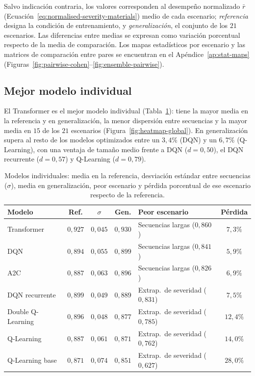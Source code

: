 \documentclass[../00_Main/Main.tex]{subfiles}
\begin{document}
\label{sec:results}

Salvo indicaci\'on contraria, los valores corresponden al
desempe\~no normalizado $\bar r$
(Ecuaci\'on~\eqref{eq:normalised-severity-materials}) medio de cada
escenario; \emph{referencia} designa la condici\'on de entrenamiento, y
\emph{generalizaci\'on}, el conjunto de los $21$ escenarios. Las diferencias
entre medias se expresan como variaci\'on porcentual respecto de la media
de comparaci\'on. Los mapas
estad\'isticos por escenario y las matrices de comparaci\'on entre pares
se encuentran en el Ap\'endice~\ref{ap:stat-maps}
(Figuras~\ref{fig:pairwise-cohen}--\ref{fig:ensemble-pairwise}).

\subsection{Mejor modelo individual}\label{sec:res-individual}

El Transformer es el mejor modelo individual
(Tabla~\ref{tab:global-mean}): tiene la mayor media en la referencia y
en generalizaci\'on, la menor dispersi\'on entre secuencias y la mayor
media en $15$ de los $21$ escenarios (Figura~\ref{fig:heatmap-global}).
En generalizaci\'on supera al resto de los modelos optimizados entre un
$3{,}4\%$ (DQN) y un $6{,}7\%$ (Q-Learning), con una ventaja de tama\~no
medio frente a DQN ($d = 0{,}50$), el DQN recurrente ($d = 0{,}57$) y
Q-Learning ($d = 0{,}79$).

\begin{table}[H]
\centering
\caption[Desempe\~no de los modelos individuales]{Modelos individuales:
media en la referencia, desviaci\'on est\'andar entre secuencias
($\sigma$), media en generalizaci\'on, peor escenario y p\'erdida
porcentual de ese escenario respecto de la referencia.}
\label{tab:global-mean}
\small
\setlength{\tabcolsep}{4pt}
\begin{tabular}{@{}lccclc@{}}
\toprule
\textbf{Modelo} & \textbf{Ref.} & $\sigma$ & \textbf{Gen.} & \textbf{Peor escenario} & \textbf{P\'erdida} \\
\midrule
Transformer       & $0{,}927$ & $0{,}045$ & $0{,}930$ & Secuencias largas ($0{,}860$) & $7{,}3\%$ \\
DQN               & $0{,}894$ & $0{,}055$ & $0{,}899$ & Secuencias largas ($0{,}841$) & $5{,}9\%$ \\
A2C               & $0{,}887$ & $0{,}063$ & $0{,}896$ & Secuencias largas ($0{,}826$) & $6{,}9\%$ \\
DQN recurrente    & $0{,}899$ & $0{,}049$ & $0{,}889$ & Extrap.\ de severidad ($0{,}831$) & $7{,}5\%$ \\
Double Q-Learning & $0{,}896$ & $0{,}048$ & $0{,}877$ & Extrap.\ de severidad ($0{,}785$) & $12{,}4\%$ \\
Q-Learning        & $0{,}887$ & $0{,}061$ & $0{,}871$ & Extrap.\ de severidad ($0{,}762$) & $14{,}0\%$ \\
Q-Learning base   & $0{,}871$ & $0{,}074$ & $0{,}851$ & Extrap.\ de severidad ($0{,}627$) & $28{,}0\%$ \\
\bottomrule
\end{tabular}
\end{table}
\end{document}
